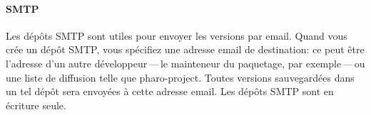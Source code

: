 \documentclass[a4paper,10pt,twoside]{book}
\begin{document}
\paragraph{SMTP} Les dépôts SMTP sont utiles pour envoyer les versions
par email. Quand vous crée un dépôt SMTP, vous spécifiez une adresse
email de destination: ce peut être l'adresse d'un autre
développeur\,---\,le mainteneur du paquetage, par exemple\,---\,ou une
liste de diffusion telle que pharo-project.
Toutes versions sauvegardées dans un tel dépôt sera envoyées à cette
adresse email. Les dépôts SMTP sont en écriture seule.






\end{document}
